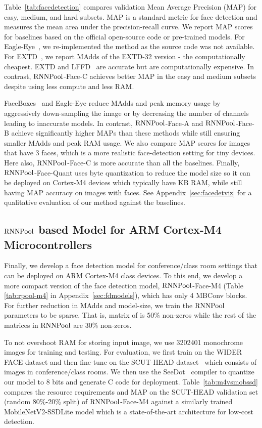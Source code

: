 \documentclass[10pt]{article}
\newcommand{\rpool}{\ensuremath{{\rm RNNPool}}\xspace}
\begin{document}
Table~\ref{tab:facedetection} compares validation Mean Average
Precision (MAP) for easy, medium, and hard subsets. MAP is a standard
metric for face detection and measures the mean area under the
precision-recall curve.
We report MAP scores for baselines
based on the official open-source code or pre-trained models. For
Eagle-Eye~\citep{zhao2019real}, we re-implemented the method as the
source code was not available. For EXTD~\citep{yoo2019extd}, we report
MAdds of the EXTD-32 version - the computationally cheapest. EXTD and
LFFD~\citep{he2019lffd} are accurate but are computationally
expensive. In contrast, \rpool-Face-C achieves better MAP in the easy
and medium subsets despite using  less compute and
 less RAM.

FaceBoxes~\citep{zhang2017faceboxes} and Eagle-Eye reduce MAdds and
peak memory usage by aggressively down-sampling the image or by decreasing
the number of channels leading to inaccurate models. In
contrast, \rpool-Face-A and \rpool-Face-B achieve significantly higher
MAPs than these methods while still ensuring smaller MAdds and peak
RAM usage. We also compare MAP scores for images that have  3
faces, which is a more realistic face-detection setting for
tiny devices. Here also, \rpool-Face-C is more
accurate than all the baselines. Finally, \rpool-Face-Quant uses byte quantization to
reduce the model size so it can be deployed on Cortex-M4 devices which
typically have  KB RAM, while still having  MAP
accuracy on images with  faces. See
Appendix~\ref{sec:facedetviz} for a qualitative evaluation of our
method against the baselines.

\subsection{\rpool based Model for ARM Cortex-M4 Microcontrollers}
Finally, we develop a face detection model for conference/class room settings that can be deployed on ARM Cortex-M4 class devices. To this end,  we develop a
more compact version of the face detection model, \rpool-Face-M4
(Table \ref{tab:rpool-m4} in Appendix~\ref{sec:fdmodels}), which has
only 4 MBConv blocks. For further reduction in MAdds and model-size, we train the \rpool parameters to be sparse. That is, 
 matrix of  is 50\% non-zeros while the rest
of the matrices in \rpool are 30\% non-zeros.

To not overshoot RAM for storing input image, we use
3202401 monochrome images for training and testing.
For evaluation, we first train on the WIDER FACE dataset and then
fine-tune on the SCUT-HEAD dataset~\citep{peng2018detecting} which consists of images in conference/class rooms. We then
use the SeeDot~\citep{gopinath2019compiling} compiler to quantize our
model to 8 bits and generate C code for
deployment. Table~\ref{tab:m4vsmobssd} compares the resource
requirements and MAP on the SCUT-HEAD validation set (random 80\%-20\% split)
of \rpool-Face-M4 against a similarly trained MobileNetV2-SSDLite
model which is a state-of-the-art architecture for low-cost detection.
\end{document}
